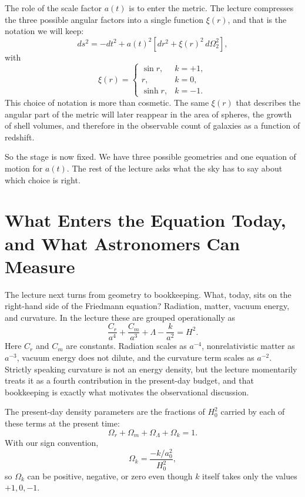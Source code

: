 The role of the scale factor \(a(t)\) is to enter the metric. The lecture compresses the three possible angular factors into a single function \(\xi(r)\), and that is the notation we will keep:
\begin{equation}
ds^2=-dt^2+a(t)^2\left[dr^2+\xi(r)^2\,d\Omega_2^2\right],
\end{equation}
with
\begin{equation}
\xi(r)=
\begin{cases}
\sin r, & k=+1,\\[4pt]
r, & k=0,\\[4pt]
\sinh r, & k=-1.
\end{cases}
\end{equation}
This choice of notation is more than cosmetic. The same \(\xi(r)\) that describes the angular part of the metric will later reappear in the area of spheres, the growth of shell volumes, and therefore in the observable count of galaxies as a function of redshift.

So the stage is now fixed. We have three possible geometries and one equation of motion for \(a(t)\). The rest of the lecture asks what the sky has to say about which choice is right.

\section{What Enters the Equation Today, and What Astronomers Can Measure}

The lecture next turns from geometry to bookkeeping. What, today, sits on the right-hand side of the Friedmann equation? Radiation, matter, vacuum energy, and curvature. In the lecture these are grouped operationally as
\begin{equation}
\frac{C_r}{a^4}+\frac{C_m}{a^3}+\Lambda-\frac{k}{a^2}=H^2.
\end{equation}
Here \(C_r\) and \(C_m\) are constants. Radiation scales as \(a^{-4}\), nonrelativistic matter as \(a^{-3}\), vacuum energy does not dilute, and the curvature term scales as \(a^{-2}\). Strictly speaking curvature is not an energy density, but the lecture momentarily treats it as a fourth contribution in the present-day budget, and that bookkeeping is exactly what motivates the observational discussion.

\begin{definition}
The present-day density parameters are the fractions of \(H_0^2\) carried by each of these terms at the present time:
\begin{equation}
\Omega_r+\Omega_m+\Omega_\Lambda+\Omega_k=1.
\end{equation}
With our sign convention,
\begin{equation}
\Omega_k=\frac{-k/a_0^2}{H_0^2},
\end{equation}
so \(\Omega_k\) can be positive, negative, or zero even though \(k\) itself takes only the values \(+1,0,-1\).
\end{definition}

